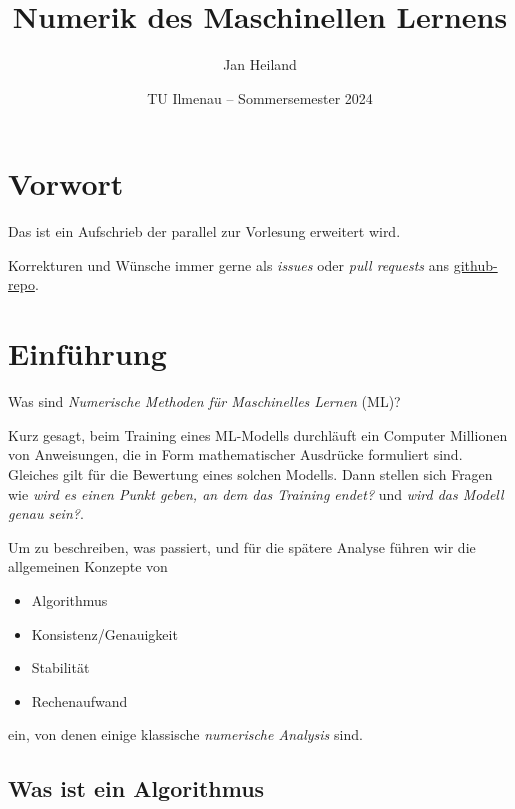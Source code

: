 \documentclass[
]{book}
\title{Numerik des Maschinellen Lernens}
\author{Jan Heiland}
\date{TU Ilmenau -- Sommersemester 2024}
\providecommand{\tightlist}{%
  \setlength{\itemsep}{0pt}\setlength{\parskip}{0pt}}
\theoremstyle{definition}
\theoremstyle{definition}
\theoremstyle{definition}
\theoremstyle{definition}
\theoremstyle{remark}
\begin{document}
\maketitle

{
\hypersetup{linkcolor=}
\setcounter{tocdepth}{1}
\tableofcontents
}
\hypertarget{vorwort}{%
\chapter*{Vorwort}\label{vorwort}}

Das ist ein Aufschrieb der parallel zur Vorlesung erweitert wird.

Korrekturen und Wünsche immer gerne als \emph{issues} oder \emph{pull requests} ans \href{https://github.com/highlando/script-ndml}{github-repo}.

\hypertarget{einfuxfchrung}{%
\chapter{Einführung}\label{einfuxfchrung}}

Was sind \emph{Numerische Methoden für Maschinelles Lernen} (ML)?

Kurz gesagt, beim Training eines ML-Modells durchläuft ein Computer Millionen von Anweisungen, die in Form mathematischer Ausdrücke formuliert sind. Gleiches gilt für die Bewertung eines solchen Modells.
Dann stellen sich Fragen wie \emph{wird es einen Punkt geben, an dem das Training endet?} und \emph{wird das Modell genau sein?}.

Um zu beschreiben, was passiert, und für die spätere Analyse führen wir die allgemeinen Konzepte von

\begin{itemize}
\tightlist
\item
  Algorithmus
\item
  Konsistenz/Genauigkeit
\item
  Stabilität
\item
  Rechenaufwand
\end{itemize}

ein, von denen einige klassische \emph{numerische Analysis} sind.

\hypertarget{was-ist-ein-algorithmus}{%
\section{Was ist ein Algorithmus}\label{was-ist-ein-algorithmus}}
\end{document}
